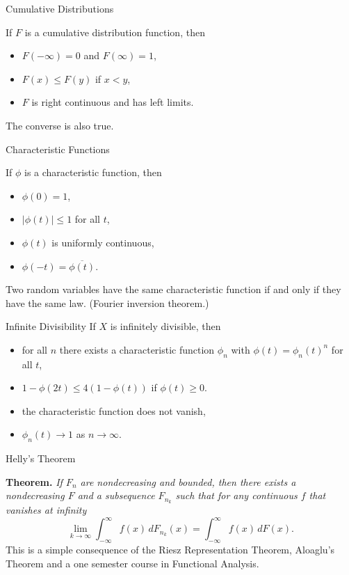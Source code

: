 \documentclass[pdf,colorBG,slideColor,blends]{prosper}
\begin{document}
\begin{slide}{Cumulative Distributions}

If $F$ is a cumulative distribution function, then
\begin{itemize}
\item $F(-\infty) = 0$ and $F(\infty) = 1$,
\item $F(x) \le F(y)$ if $x < y$,
\item $F$ is right continuous and has left limits.
\end{itemize}

\medskip

The converse is also true.

\end{slide}

\begin{slide}{Characteristic Functions}

If $\phi$ is a characteristic function, then
\begin{itemize}
\item $\phi(0) = 1$,
\item $|\phi(t)| \le 1$ for all $t$,
\item $\phi(t)$ is uniformly continuous,
\item $\phi(-t) = \overline{\phi(t)}$.
\end{itemize}

\medskip

Two random variables have the same characteristic function if
and only if they have the same law. (Fourier inversion theorem.)

\end{slide}

\begin{slide}{Infinite Divisibility}
If $X$ is infinitely divisible, then
\begin{itemize}
\item for all $n$ there exists a characteristic function $\phi_n$
with $\phi(t) = \phi_n(t)^n$ for all $t$,
\item $1 - \phi(2t) \le 4(1 - \phi(t))$ if $\phi(t) \ge 0$.
\item the characteristic function does not vanish,
\item $\phi_n(t) \to 1$ as $n\to\infty$.
\end{itemize}

\end{slide}

\begin{slide}{Helly's Theorem}

{\bf Theorem.} {\it If $F_n$ are nondecreasing and bounded,
then there exists a
nondecreasing $F$ and a subsequence $F_{n_k}$ such that
for any continuous $f$ that vanishes at infinity}
$$\lim_{k\to\infty}\int_{-\infty}^\infty f(x)\,dF_{n_k}(x)
		= \int_{-\infty}^\infty f(x)\,dF(x).$$
\smallskip
This is a simple consequence of the Riesz Representation Theorem,
Aloaglu's Theorem and a one semester course in Functional Analysis.

\end{slide}
\end{document}

